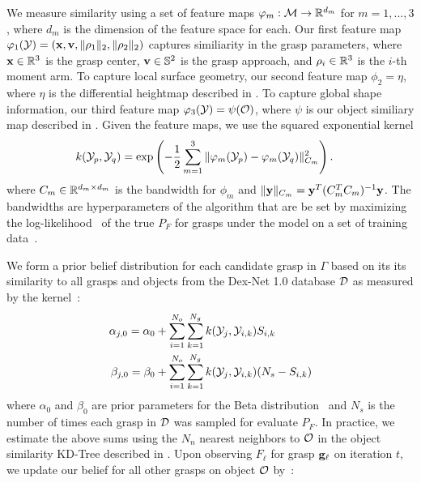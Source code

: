 We measure similarity using a set of feature maps $\varphi_m: \mathcal{M} \rightarrow \mathbb{R}^{d_m}$ for $m = 1, ..., 3$, where $d_m$ is the dimension of the feature space for each.
Our first feature map $\varphi_{1}(\mathcal{Y}) = (\mathbf{x}, \mathbf{v}, \| \rho_1 \|_2, \| \rho_2 \|_2)$ captures similiarity in the grasp parameters, where $\mathbf{x} \in \mathbb{R}^3$ is the grasp center, $\mathbf{v} \in \mathbb{S}^2$ is the grasp approach, and $\rho_i \in \mathbb{R}^3$ is the $i$-th moment arm.
To capture local surface geometry, our second feature map $\phi_{2} = \eta$, where $\eta$ is the differential heightmap described in .
To capture global shape information, our third feature map $\varphi_{3}(\mathcal{Y}) = \psi(\mathcal{O})$, where $\psi$ is our object similiary map described in .
Given the feature maps, we use the squared exponential kernel 
\begin{align*}
	k(\mathcal{Y}_p, \mathcal{Y}_q) &= \exp\left( - \frac{1}{2} \sum \limits_{m=1}^{3} \|\varphi_m(\mathcal{Y}_p) - \varphi_m(\mathcal{Y}_q)\|_{C_m}^2 \right).
\end{align*}
\noindent where $C_m \in \mathbb{R}^{d_m \times d_m}$ is the bandwidth for $\phi_m$ and $\| \mathbf{y} \|_{C_m} = \mathbf{y}^T (C_m^T C_m)^{-1} \mathbf{y}$.
The bandwidths are hyperparameters of the algorithm that are be set by maximizing the log-likelihood~\cite{goetschalckx2011continuous} of the true $P_F$ for grasps under the model on a set of training data~\cite{rasmussen2006}.

We form a prior belief distribution for each candidate grasp in $\Gamma$ based on its its similarity to all grasps and objects from the Dex-Net 1.0 database $\mathcal{D}$ as measured by the kernel~\cite{goetschalckx2011continuous}:
\begin{align}
	\alpha_{j,0} = \alpha_{0} & + \sum \limits_{i=1}^{N_o} \sum \limits_{k=1}^{N_g} k(\mathcal{Y}_{j}, \mathcal{Y}_{i, k}) S_{i,k} \label{eq:alpha-prior} \\
	\beta_{j,0} = \beta_{0} & + \sum \limits_{i=1}^{N_o} \sum \limits_{k=1}^{N_g}  k(\mathcal{Y}_{j}, \mathcal{Y}_{i,k}) (N_s - S_{i,k}) \label{eq:beta-prior}
\end{align}
\noindent where $\alpha_{0}$ and $\beta_{0}$ are prior parameters for the Beta distribution~\cite{laskey2015bandits} and $N_s$ is the number of times each grasp in $\mathcal{D}$ was sampled for evaluate $P_F$.
In practice, we estimate the above sums using the $N_n$ nearest neighbors to $\mathcal{O}$ in the object similarity KD-Tree described in .
Upon observing $F_{\ell}$ for grasp $\mathbf{g}_{\ell}$ on iteration $t$, we update our belief for all other grasps on object $\mathcal{O}$ by~\cite{goetschalckx2011continuous}:

